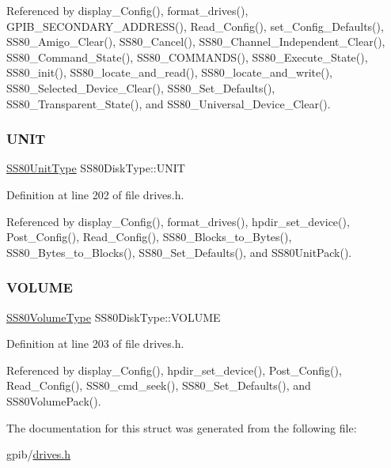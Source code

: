 Referenced by display\+\_\+\+Config(), format\+\_\+drives(), G\+P\+I\+B\+\_\+\+S\+E\+C\+O\+N\+D\+A\+R\+Y\+\_\+\+A\+D\+D\+R\+E\+S\+S(), Read\+\_\+\+Config(), set\+\_\+\+Config\+\_\+\+Defaults(), S\+S80\+\_\+\+Amigo\+\_\+\+Clear(), S\+S80\+\_\+\+Cancel(), S\+S80\+\_\+\+Channel\+\_\+\+Independent\+\_\+\+Clear(), S\+S80\+\_\+\+Command\+\_\+\+State(), S\+S80\+\_\+\+C\+O\+M\+M\+A\+N\+D\+S(), S\+S80\+\_\+\+Execute\+\_\+\+State(), S\+S80\+\_\+init(), S\+S80\+\_\+locate\+\_\+and\+\_\+read(), S\+S80\+\_\+locate\+\_\+and\+\_\+write(), S\+S80\+\_\+\+Selected\+\_\+\+Device\+\_\+\+Clear(), S\+S80\+\_\+\+Set\+\_\+\+Defaults(), S\+S80\+\_\+\+Transparent\+\_\+\+State(), and S\+S80\+\_\+\+Universal\+\_\+\+Device\+\_\+\+Clear().

\mbox{\label{structSS80DiskType_ac630da1440afd60d726c7c41eb7b990c}} 
\subsubsection{\texorpdfstring{U\+N\+IT}{UNIT}}
{\footnotesize\ttfamily \hyperlink{structSS80UnitType}{S\+S80\+Unit\+Type} S\+S80\+Disk\+Type\+::\+U\+N\+IT}



Definition at line 202 of file drives.\+h.



Referenced by display\+\_\+\+Config(), format\+\_\+drives(), hpdir\+\_\+set\+\_\+device(), Post\+\_\+\+Config(), Read\+\_\+\+Config(), S\+S80\+\_\+\+Blocks\+\_\+to\+\_\+\+Bytes(), S\+S80\+\_\+\+Bytes\+\_\+to\+\_\+\+Blocks(), S\+S80\+\_\+\+Set\+\_\+\+Defaults(), and S\+S80\+Unit\+Pack().

\mbox{\label{structSS80DiskType_adef69576dbc48a5d70ff628578d77b60}} 
\subsubsection{\texorpdfstring{V\+O\+L\+U\+ME}{VOLUME}}
{\footnotesize\ttfamily \hyperlink{structSS80VolumeType}{S\+S80\+Volume\+Type} S\+S80\+Disk\+Type\+::\+V\+O\+L\+U\+ME}



Definition at line 203 of file drives.\+h.



Referenced by display\+\_\+\+Config(), hpdir\+\_\+set\+\_\+device(), Post\+\_\+\+Config(), Read\+\_\+\+Config(), S\+S80\+\_\+cmd\+\_\+seek(), S\+S80\+\_\+\+Set\+\_\+\+Defaults(), and S\+S80\+Volume\+Pack().



The documentation for this struct was generated from the following file\+:\begin{DoxyCompactItemize}
\item 
gpib/\hyperlink{drives_8h}{drives.\+h}\end{DoxyCompactItemize}
